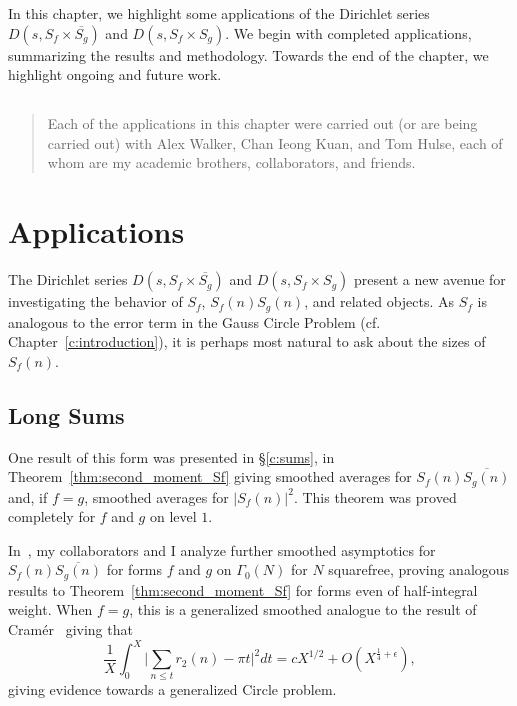 
In this chapter, we highlight some applications of the Dirichlet series $D(s, S_f \times
\overline{S_g})$ and $D(s, S_f \times S_g)$.
We begin with completed applications, summarizing the results and methodology.
Towards the end of the chapter, we highlight ongoing and future work.


\vspace{-1in}
\subsection*{}

\begin{quote}
  Each of the applications in this chapter were carried out (or are being carried out)
  with Alex Walker, Chan Ieong Kuan, and Tom Hulse, each of whom are my academic brothers,
  collaborators, and friends.
\end{quote}




\section{Applications}


The Dirichlet series $D(s, S_f \times \overline{S_g})$ and $D(s, S_f \times S_g)$ present
a new avenue for investigating the behavior of $S_f$, $S_f(n)S_g(n)$, and related objects.
As $S_f$ is analogous to the error term in the Gauss Circle Problem (cf.
Chapter~\ref{c:introduction}), it is perhaps most natural to ask about the sizes of
$S_f(n)$.



\subsection*{Long Sums}


One result of this form was presented in \S\ref{c:sums}, in
Theorem~\ref{thm:second_moment_Sf} giving smoothed averages for $S_f(n)\overline{S_g(n)}$
and, if $f = g$, smoothed averages for $\lvert S_f(n) \rvert^2$.
This theorem was proved completely for $f$ and $g$ on level $1$.


In~\cite{hkldw}, my collaborators and I analyze further smoothed asymptotics for
$S_f(n)\overline{S_g(n)}$ for forms $f$ and $g$ on $\Gamma_0(N)$ for $N$ squarefree,
proving analogous results to Theorem~\ref{thm:second_moment_Sf} for forms even of
half-integral weight.
When $f = g$, this is a generalized smoothed analogue to the result of
Cram\'er~\cite{cramer1922} giving that
\begin{equation}
  \frac{1}{X} \int_0^X \Big \lvert \sum_{n \leq t} r_2(n) - \pi t \Big \rvert^2 dt = c
  X^{1/2} + O(X^{\frac{1}{4} + \epsilon}),
\end{equation}
giving evidence towards a generalized Circle problem.


